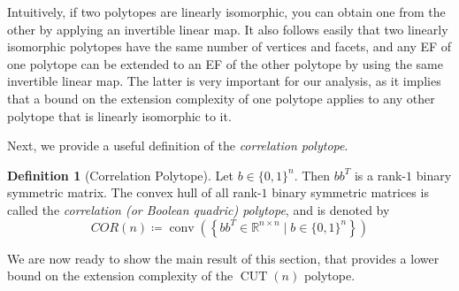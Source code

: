 \documentclass{article}
\theoremstyle{definition}
\newtheorem{definition}[theorem]{Definition}
\theoremstyle{remark}
\newcommand{\conv}{\operatorname{conv}}
\newcommand{\CUT}{\operatorname{CUT}}
\renewcommand{\R}{\mathbb{R}}
\begin{document}
Intuitively, if two polytopes are linearly isomorphic, you can obtain one from the other by applying an invertible linear map. It also follows easily that two linearly isomorphic polytopes have the same number of vertices and facets, and any EF of one polytope can be extended to an EF of the other polytope by using the same invertible linear map. The latter is very important for our analysis, as it implies that a bound on the extension complexity of one polytope applies to any other polytope that is linearly isomorphic to it.

Next, we provide a useful definition of the \textit{correlation polytope}.

\begin{definition}[Correlation Polytope]\label{def:cor}
Let $b \in {\{0, 1\}}^n$. Then $b b^T$ is a rank-$1$ binary symmetric matrix. The convex hull of all rank-$1$ binary symmetric matrices is called
the \textit{correlation (or Boolean quadric) polytope}, and is denoted by
\[
COR(n) \coloneqq \conv\left( \left\{ bb^T \in \R^{n \times n} \mid b \in {\{0, 1\}}^n \right\} \right)
\]
\end{definition}

We are now ready to show the main result of this section, that provides a lower bound on the extension complexity of the $\CUT(n)$ polytope.
\end{document}
